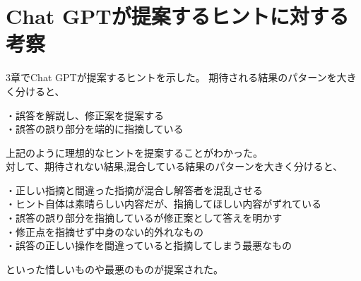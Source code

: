 \chapter{Chat GPTが提案するヒントに対する考察}
3章でChat GPTが提案するヒントを示した。
期待される結果のパターンを大きく分けると、
\begin{screen}
・誤答を解説し、修正案を提案する\\
・誤答の誤り部分を端的に指摘している
\end{screen}
上記のように理想的なヒントを提案することがわかった。\\
対して、期待されない結果,混合している結果のパターンを大きく分けると、\\
\begin{screen}
・正しい指摘と間違った指摘が混合し解答者を混乱させる\\
・ヒント自体は素晴らしい内容だが、指摘してほしい内容がずれている\\
・誤答の誤り部分を指摘しているが修正案として答えを明かす\\
・修正点を指摘せず中身のない的外れなもの\\
・誤答の正しい操作を間違っていると指摘してしまう最悪なもの
\end{screen}
といった惜しいものや最悪のものが提案された。\\


